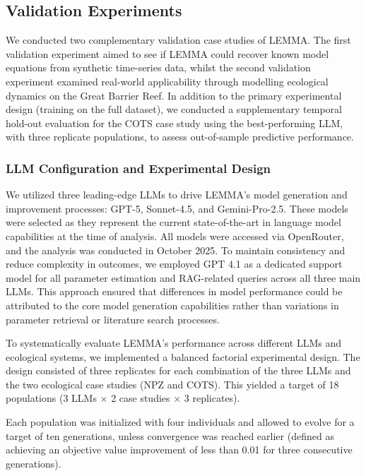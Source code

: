 \subsection{Validation Experiments}

We conducted two complementary validation case studies of LEMMA. The first validation experiment aimed to see if LEMMA could recover known model equations from synthetic time-series data, whilst the second validation experiment examined real-world applicability through modelling ecological dynamics on the Great Barrier Reef. In addition to the primary experimental design (training on the full dataset), we conducted a supplementary temporal hold-out evaluation for the COTS case study using the best-performing LLM, with three replicate populations, to assess out-of-sample predictive performance.

\subsubsection{LLM Configuration and Experimental Design}

We utilized three leading-edge LLMs to drive LEMMA's model generation and improvement processes: GPT-5, Sonnet-4.5, and Gemini-Pro-2.5. These models were selected as they represent the current state-of-the-art in language model capabilities at the time of analysis. All models were accessed via OpenRouter, and the analysis was conducted in October 2025. To maintain consistency and reduce complexity in outcomes, we employed GPT 4.1 as a dedicated support model for all parameter estimation and RAG-related queries across all three main LLMs. This approach ensured that differences in model performance could be attributed to the core model generation capabilities rather than variations in parameter retrieval or literature search processes.

To systematically evaluate LEMMA's performance across different LLMs and ecological systems, we implemented a balanced factorial experimental design. The design consisted of three replicates for each combination of the three LLMs and the two ecological case studies (NPZ and COTS). This yielded a target of 18 populations (3 LLMs $\times$ 2 case studies $\times$ 3 replicates).

Each population was initialized with four individuals and allowed to evolve for a target of ten generations, unless convergence was reached earlier (defined as achieving an objective value improvement of less than 0.01 for three consecutive generations).

